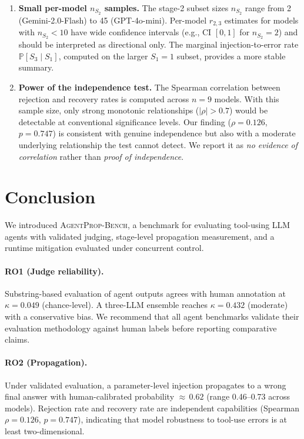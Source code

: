 \documentclass[preprint,review,12pt,3p]{elsarticle}
\newcommand{\bench}{\textsc{AgentProp-Bench}\xspace}
\renewcommand{\Pr}{\mathbb{P}}
\begin{document}
\begin{enumerate}
  \item \textbf{Small per-model $n_{S_2}$ samples.}
    The stage-2 subset sizes $n_{S_2}$ range from 2 (Gemini-2.0-Flash)
    to 45 (GPT-4o-mini).
    Per-model $r_{2,3}$ estimates for models with $n_{S_2} < 10$ have
    wide confidence intervals (e.g., CI $[0, 1]$ for $n_{S_2}{=}2$)
    and should be interpreted as directional only.
    The marginal injection-to-error rate $\Pr[S_3 \mid S_1]$, computed
    on the larger $S_1{=}1$ subset, provides a more stable summary.

  \item \textbf{Power of the independence test.}
    The Spearman correlation between rejection and recovery rates is
    computed across $n{=}9$ models.
    With this sample size, only strong monotonic relationships
    ($|\rho| > 0.7$) would be detectable at conventional significance
    levels.
    Our finding ($\rho{=}0.126$, $p{=}0.747$) is consistent with
    genuine independence but also with a moderate underlying relationship
    the test cannot detect.
    We report it as \emph{no evidence of correlation} rather than
    \emph{proof of independence}.
\end{enumerate}


\section{Conclusion}
\label{sec:conclusion}

We introduced \bench{}, a benchmark for evaluating tool-using LLM agents
with validated judging, stage-level propagation measurement, and a
runtime mitigation evaluated under concurrent control.

\paragraph{RO1 (Judge reliability).}
Substring-based evaluation of agent outputs agrees with human annotation
at $\kappa{=}0.049$ (chance-level).
A three-LLM ensemble reaches $\kappa{=}0.432$ (moderate) with a
conservative bias.
We recommend that all agent benchmarks validate their evaluation
methodology against human labels before reporting comparative claims.

\paragraph{RO2 (Propagation).}
Under validated evaluation, a parameter-level injection propagates to a
wrong final answer with human-calibrated probability ${\approx}\,0.62$
(range 0.46--0.73 across models).
Rejection rate and recovery rate are independent capabilities
(Spearman $\rho{=}0.126$, $p{=}0.747$), indicating that model
robustness to tool-use errors is at least two-dimensional.
\end{document}
